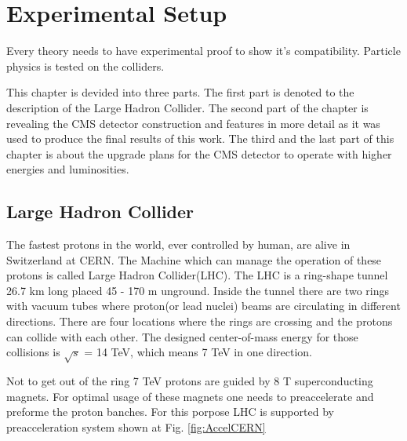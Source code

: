 \chapter{Experimental Setup}
Every theory needs to have experimental proof to show it's compatibility. Particle physics is tested on
the colliders.


This chapter is devided into three parts.
The first part is denoted to the description of the Large Hadron Collider. The second part of the 
chapter is revealing the CMS detector construction and features in more detail as it was used to produce the final
results of this work. The third and the last part of this chapter is about the upgrade plans for the
CMS detector to operate with higher energies and luminosities.

\section{Large Hadron Collider}

The fastest protons in the world, ever controlled by human, are alive in Switzerland at CERN.
The Machine which can manage the operation of these protons is called Large Hadron Collider(LHC). 
The LHC is a ring-shape tunnel 26.7 km long  placed 45 - 170 m unground. 
Inside the tunnel there are two rings with vacuum tubes where proton(or lead nuclei) beams are circulating in different directions.
There are four locations where the rings are crossing and the protons can collide with each other. 
The designed center-of-mass energy for those collisions is $\sqrt{s}$ = 14 TeV, which means 7 TeV in one direction.


Not to get out of the ring 7 TeV protons are guided by 8 T superconducting magnets. 
For optimal usage of these magnets one needs to preaccelerate and preforme the proton banches.
For this porpose LHC is supported by preacceleration system shown at Fig. \ref{fig:AccelCERN}


